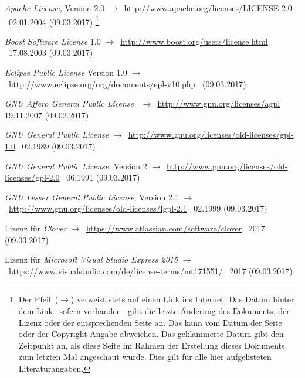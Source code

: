 \documentclass[english,ngerman,parskip=half,headsepline,footsepline]{scrreprt}
\begin{document}

   	\begin{flushleft}
		\begin{thebibliography}{12}
			\ihead{\textnormal{\textsf{\textbf{\bibname}}}}
			\thispagestyle{scrheadings}

			\emph{Apache License}, Version 2.0 $\rightarrow$~\url{http://www.apache.org/licenses/LICENSE-2.0} \textendash\ 02.01.2004 (09.03.2017)
			\footnote{ Der Pfeil~($\rightarrow$) verweist stets auf einen Link ins Internet. Das Datum hinter dem Link \textendash\ sofern vorhanden \textendash\ gibt die letzte Änderung des Dokuments, der Lizenz oder der entsprechenden Seite an. Das kann vom Datum der Seite oder der Copyright-Angabe abweichen. Das geklammerte Datum gibt den Zeitpunkt an, als diese Seite im Rahmen der Erstellung dieses Dokuments zum letzten Mal angeschaut wurde. Dies gilt für alle hier aufgelisteten Literaturangaben.}

			\emph{Boost Software License} 1.0 $\rightarrow$~\url{http://www.boost.org/users/license.html} \textendash\ 17.08.2003 (09.03.2017)

			\emph{Eclipse Public License} Version 1.0 $\rightarrow$~\url{http://www.eclipse.org/org/documents/epl-v10.php} \textendash\ (09.03.2017)

			\emph{GNU Affero General Public License} \textendash\ $\rightarrow$~\url{http://www.gnu.org/licenses/agpl} 19.11.2007 (09.02.2017)

			\emph{GNU General Public License} $\rightarrow$~\url{http://www.gnu.org/licenses/old-licenses/gpl-1.0} \textendash\ 02.1989 (09.03.2017)

			\emph{GNU General Public License}, Version 2 $\rightarrow$~\url{http://www.gnu.org/licenses/old-licenses/gpl-2.0} \textendash\ 06.1991 (09.03.2017)

			\emph{GNU Lesser General Public License}, Version 2.1 $\rightarrow$~\url{http://www.gnu.org/licenses/old-licenses/lgpl-2.1} \textendash\ 02.1999 (09.03.2017)

			Lizenz für \emph{Clover} $\rightarrow$~\url{https://www.atlassian.com/software/clover} \textendash\ 2017 (09.03.2017)

			Lizenz für \emph{Microsoft Visual Studio Express 2015} $\rightarrow$~\url{https://www.visualstudio.com/de/license-terms/mt171551/} \textendash\ 2017 (09.03.2017)


\end{thebibliography}
\end{flushleft}
\end{document}
